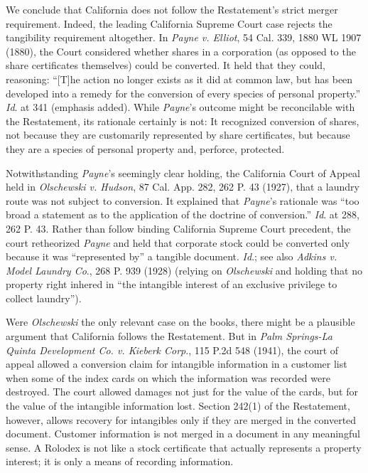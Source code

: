 We conclude that California does not follow the Restatement's strict merger
requirement. Indeed, the leading California Supreme Court case rejects the
tangibility requirement altogether. In \textit{Payne v. Elliot}, 54 Cal. 339,
1880 WL 1907 (1880), the Court considered whether shares in a corporation (as
opposed to the share certificates themselves) could be converted. It held that
they could, reasoning: ``[T]he action no longer exists as it did at common law,
but has been developed into a remedy for the conversion of every species of
personal property.'' \textit{Id}. at 341 (emphasis added). While \emph{Payne}'s
outcome might be reconcilable with the Restatement, its rationale certainly is
not: It recognized conversion of shares, not because they are customarily
represented by share certificates, but because they are a species of personal
property and, perforce, protected.

Notwithstanding \emph{Payne}'s seemingly clear holding, the California Court of
Appeal
held in \textit{Olschewski v. Hudson}, 87 Cal. App. 282, 262 P. 43 (1927), that
a laundry route was not subject to conversion. It explained that \emph{Payne}'s
rationale was ``too broad a statement as to the application of the doctrine of
conversion.'' \textit{Id}. at 288, 262 P. 43. Rather than follow binding
California Supreme Court precedent, the court retheorized \emph{Payne} and held
that
corporate stock could be converted only because it was ``represented by'' a
tangible document. \textit{Id}.; see also \textit{Adkins v. Model Laundry Co}.,
268 P. 939 (1928) (relying on \textit{Olschewski} and holding that no property
right inhered in ``the intangible interest of an exclusive privilege to collect
laundry'').

Were \textit{Olschewski} the only relevant case on the books, there might be a
plausible argument that California follows the Restatement. But in \textit{Palm
Springs-La Quinta Development Co. v. Kieberk Corp}., 115 P.2d 548 (1941), the
court of appeal allowed a conversion claim for intangible information in a
customer list when some of the index cards on which the information was
recorded were destroyed. The court allowed damages not just for the value of
the cards, but for the value of the intangible information lost. Section 242(1)
of the Restatement, however, allows recovery for intangibles only if they are
merged in the converted document. Customer information is not merged in a
document in any meaningful sense. A Rolodex is not like a stock certificate
that actually represents a property interest; it is only a means of recording
information.

